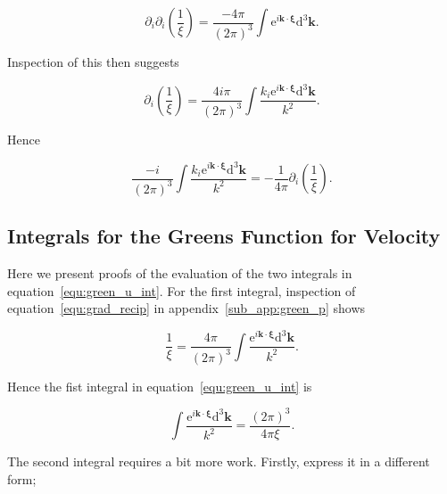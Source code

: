 \documentclass[12pt]{article}
\begin{document}
\begin{equation}
\label{equ:del_square_recip}
\partial_{i} \partial_{i} \left(\frac{1}{\xi}\right) = \frac{-4 \pi}{(2 \pi)^{3}} \int \mathrm{e}^{i \boldsymbol{k} \cdot \boldsymbol{\xi}} \mathrm{d}^{3} \boldsymbol{k} .
\end{equation}

Inspection of this then suggests

\begin{equation}
\label{equ:grad_recip}
\partial_{i} \left(\frac{1}{\xi}\right) = \frac{4 i \pi}{(2 \pi)^{3}} \int \frac{ k_{i} \mathrm{e}^{i \boldsymbol{k} \cdot \boldsymbol{\xi}} \mathrm{d}^{3} \boldsymbol{k}}{k^{2}} .
\end{equation}

Hence

\begin{equation}
\label{equ:green_p_ident}
\frac{-i}{(2 \pi)^{3}} \int \frac{ k_{i} \mathrm{e}^{i \boldsymbol{k} \cdot \boldsymbol{\xi}} \mathrm{d}^{3} \boldsymbol{k}}{k^{2}} = -\frac{1}{4 \pi} \partial_{i} \left(\frac{1}{\xi}\right) .
\end{equation}

\subsection{Integrals for the Greens Function for Velocity}
\label{sub_app:green_vel}

Here we present proofs of the evaluation of the two integrals in equation~\ref{equ:green_u_int}. For the first integral, inspection of equation~\ref{equ:grad_recip} in appendix~\ref{sub_app:green_p} shows

\begin{equation}
\label{equ:recip_int}
\frac{1}{\xi} = \frac{4 \pi}{(2 \pi)^{3}} \int \frac{\mathrm{e}^{i \boldsymbol{k} \cdot \boldsymbol{\xi}} \mathrm{d}^{3} \boldsymbol{k}}{k^{2}} .
\end{equation}

Hence the fist integral in equation~\ref{equ:green_u_int} is

\begin{equation}
\label{equ:green_u_int1}
\int \frac{\mathrm{e}^{i \boldsymbol{k} \cdot \boldsymbol{\xi}} \mathrm{d}^{3} \boldsymbol{k}}{k^{2}} = \frac{(2 \pi)^{3}}{4 \pi \xi} .
\end{equation}

The second integral requires a bit more work. Firstly, express it in a different form;
\end{document}
